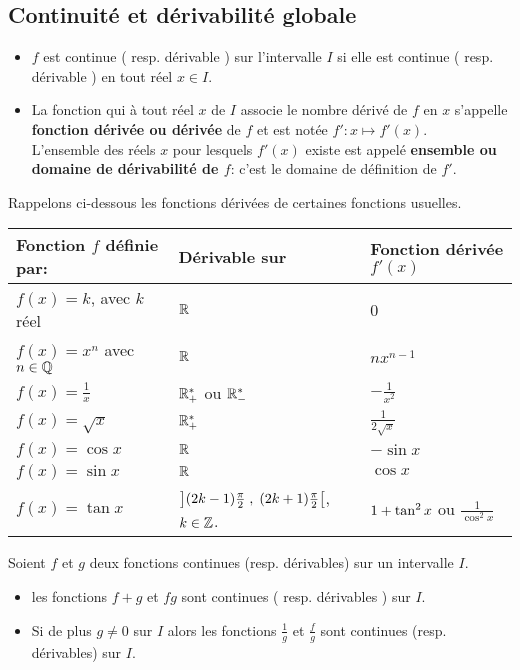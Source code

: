 \begin{example}
\subsection{Continuité et dérivabilité globale}
\begin{definition}
\begin{itemize}
\item  $ f $ est continue  ( resp. dérivable ) sur l'intervalle  $ I $ si elle est continue ( resp. dérivable ) en tout réel  $x \in I. $
\item 	La fonction qui à tout réel $ x $  de $ I $ associe le nombre dérivé de $ f $ en $ x $ s'appelle \textbf{\color{magenta} fonction dérivée  ou dérivée} de $ f $ et est notée $ f': x\mapsto f'(x) $. \\
  L'ensemble des réels $ x $ pour lesquels $f'(x) $ existe est appelé \textbf{ ensemble ou domaine de dérivabilité de $f$}: c'est le domaine de définition de $ f'. $
  \end{itemize}
\end{definition}

Rappelons  ci-dessous les fonctions dérivées de certaines fonctions usuelles.
\medskip

\begin{tabularx}{\textwidth}{|X|X|X|}
\hline
\textbf{Fonction $f$ définie par:}  & \textbf{Dérivable sur} &\textbf{ Fonction dérivée $ f'(x) $ }  \\
\hline
$ f(x)=k$, avec $k$ réel  & $\mathbb{R}$ & 0 \\
\hline
$f(x)= x^{n} $  avec $n\in \mathbb{Q}$ &  $\mathbb{R}$  & $ nx^{n-1} $   \\
\hline
$f(x)= \frac{1}{x} $ &  $\mathbb{R}_+^*$ ou $\mathbb{R}_-^*$ & $ -\frac{1}{x^{2}} $\\
\hline
$f(x)= \sqrt{x} $ &  $\mathbb{R}_+^*$ &  $ \frac{1}{2\sqrt{x}} $\\
\hline
$f(x)= \cos x $  &  $\mathbb{R}$  & $ -\sin x $ \\
\hline
$f(x)= \sin x $   &  $\mathbb{R}$  & $ \cos x $\\
\hline
$f(x)= \tan x $  &  $\left](2k-1)\frac{\pi}{2} \;,\; (2k+1)\frac{\pi}{2}\right[$, $ k\in\mathbb{Z} $.  & $\small  1+\tan^{2}x $ ou $\frac{1}{\cos^{2} x} $ \\
\hline
\end{tabularx}


\begin{property}
Soient $f $ et  $ g$ deux fonctions continues (resp. dérivables) sur un intervalle $ I. $

\begin{itemize}
\item les fonctions $ f+g $ et $ fg $ sont continues ( resp. dérivables ) sur   $ I. $
\item  Si de plus $ g\neq0 $ sur  $ I $ alors les fonctions $\frac{1}{g} $ et  $\frac{f}{g} $ sont continues (resp. dérivables) sur $ I. $
\end{itemize}
\end{property}


\end{example}
